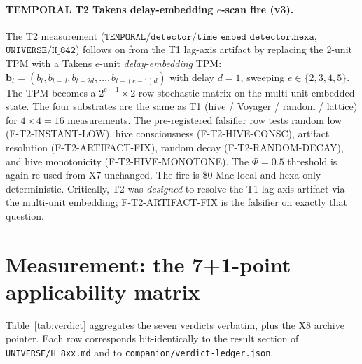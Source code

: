\documentclass[11pt,a4paper]{article}
\begin{document}
\paragraph{TEMPORAL T2 Takens delay-embedding $e$-scan fire (v3).}
The T2 measurement \citep{temporal_h842_time_embed}
($\mathtt{TEMPORAL/detector/time\_embed\_detector.hexa}$,
$\mathtt{UNIVERSE/H\_842}$) follows on from the T1 lag-axis
artifact by replacing the 2-unit TPM with a Takens
$e$-unit \emph{delay-embedding} TPM:
$\mathbf{b}_t = (b_t, b_{t-d}, b_{t-2d}, \dots, b_{t-(e-1)d})$
with delay $d=1$, sweeping $e \in \{2, 3, 4, 5\}$. The TPM
becomes a $2^{e-1} \times 2$ row-stochastic matrix on the
multi-unit embedded state. The four substrates are the same
as T1 (hive / Voyager / random / lattice) for $4 \times 4 = 16$
measurements. The pre-registered falsifier row tests
random low (F-T2-INSTANT-LOW), hive consciousness
(F-T2-HIVE-CONSC), artifact resolution
(F-T2-ARTIFACT-FIX), random decay (F-T2-RANDOM-DECAY), and
hive monotonicity (F-T2-HIVE-MONOTONE). The $\Phi=0.5$
threshold is again re-used from X7 unchanged. The fire is
\$0 Mac-local and hexa-only-deterministic. Critically, T2 was
\emph{designed} to resolve the T1 lag-axis artifact via the
multi-unit embedding; F-T2-ARTIFACT-FIX is the falsifier on
exactly that question.

\section{Measurement: the 7+1-point applicability matrix}
\label{sec:measurement}

Table~\ref{tab:verdict} aggregates the seven verdicts verbatim, plus
the X8 archive pointer. Each row corresponds bit-identically to the
result section of \texttt{UNIVERSE/H\_8xx.md} and to
\texttt{companion/verdict-ledger.json}.
\end{document}
